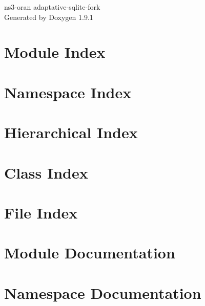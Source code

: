 \let\mypdfximage\pdfximage\def\pdfximage{\immediate\mypdfximage}\documentclass[twoside]{book}
\newcommand{\+}{\discretionary{\mbox{\scriptsize$\hookleftarrow$}}{}{}}
\newcommand{\clearemptydoublepage}{%
  \newpage{\pagestyle{empty}\cleardoublepage}%
}
\begin{document}
\raggedbottom

\hypersetup{pageanchor=false,
             bookmarksnumbered=true,
             pdfencoding=unicode
            }
\begin{titlepage}
\vspace*{7cm}
\begin{center}%
{\Large ns3-\/oran adaptative-\/sqlite-\/fork }\\
\vspace*{1cm}
{\large Generated by Doxygen 1.9.1}\\
\end{center}
\end{titlepage}
\clearemptydoublepage
{}
\tableofcontents
\clearemptydoublepage
{}
\hypersetup{pageanchor=true}

\chapter{Module Index}

\chapter{Namespace Index}

\chapter{Hierarchical Index}

\chapter{Class Index}

\chapter{File Index}

\chapter{Module Documentation}

\chapter{Namespace Documentation}

\end{document}
